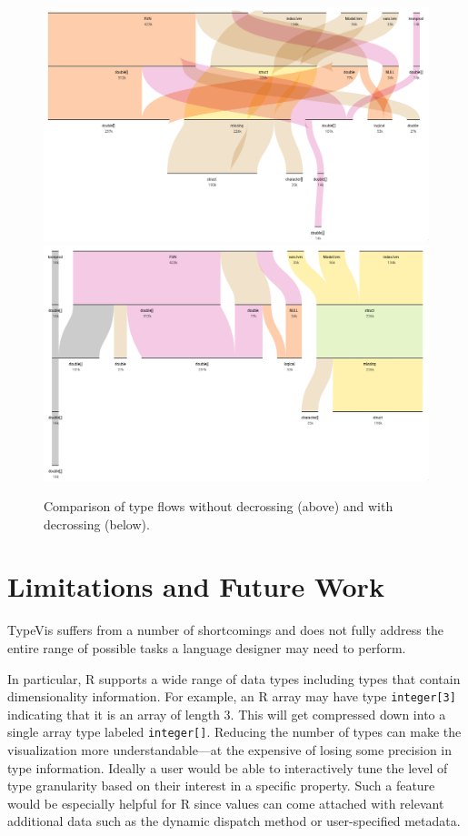 \documentclass{vgtc}                          %
\begin{document}
\begin{figure}[tb]
 \centering
 \includegraphics[width=\columnwidth]{img/no_decross.png}
 \includegraphics[width=\columnwidth]{img/decross.png}
 \caption{Comparison of type flows without decrossing (above) and with decrossing (below).}
 \label{fig:decross}
\end{figure}


\section{Limitations and Future Work}

{\sc TypeVis} suffers from a number of shortcomings
and does not fully address the entire range of possible tasks
a language designer may need to perform.

In particular, R supports a wide range of data types
including types that contain dimensionality information.
For example, an R array may have type {\tt integer[3]}
indicating that it is an array of length $3$.
This will get compressed down into a single array
type labeled {\tt integer[]}.
Reducing the number of types can make the visualization
more understandable---at the expensive of losing some
precision in type information.
Ideally a user would be able to interactively tune
the level of type granularity based on their interest
in a specific property.
Such a feature would be especially helpful for R
since values can come attached with relevant additional
data such as the dynamic dispatch method
or user-specified metadata.
\end{document}
